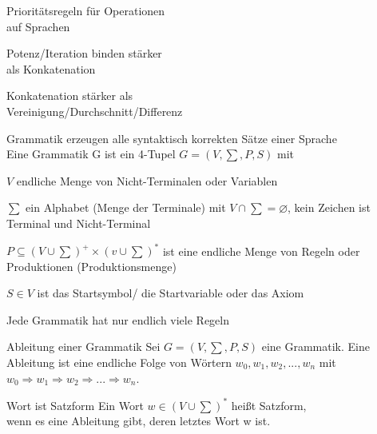 \documentclass[avery5371, frame]{flashcards}
\begin{document}
\begin{flashcard}[Definition]{Prioritätsregeln für Operationen\\ auf Sprachen}
    \begin{itemize*}
        \item Potenz/Iteration binden stärker \\als Konkatenation
        \item Konkatenation stärker als \\Vereinigung/Durchschnitt/Differenz
    \end{itemize*}
\end{flashcard}

\begin{flashcard}[Definition]{Grammatik}\scriptsize
    erzeugen alle syntaktisch korrekten Sätze einer Sprache\\
    Eine Grammatik G ist ein 4-Tupel $G=(V, \sum, P, S)$ mit
    \begin{itemize*}
        \item $V$ endliche Menge von Nicht-Terminalen oder Variablen
        \item $\sum$ ein Alphabet (Menge der Terminale) mit $V\cap\sum = \varnothing$, kein Zeichen ist Terminal und Nicht-Terminal
        \item $P\subseteq (V\cup \sum)^+ \times (v\cup\sum)^*$ ist eine endliche Menge von Regeln oder Produktionen (Produktionsmenge)
        \item $S\in V$ ist das Startsymbol/ die Startvariable oder das Axiom
    \end{itemize*}
    Jede Grammatik hat nur endlich viele Regeln
\end{flashcard}

\begin{flashcard}[Definition]{Ableitung einer Grammatik}
    Sei $G=(V, \sum, P, S)$  eine Grammatik. Eine Ableitung ist eine endliche Folge von Wörtern $w_0, w_1, w_2,...,w_n$ mit $w_0\Rightarrow w_1 \Rightarrow w_2 \Rightarrow ... \Rightarrow w_n$.
\end{flashcard}

\begin{flashcard}[Definition]{Wort ist Satzform}
    Ein Wort $w\in (V\cup\sum)^*$ heißt Satzform,\\
    wenn es eine Ableitung gibt, deren letztes Wort w ist.
\end{flashcard}
\end{document}
